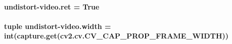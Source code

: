 \hypertarget{namespaceundistort-video_a5cf3044f0af40203e21a7231c2de5548}{
\paragraph[{ret}]{\setlength{\rightskip}{0pt plus 5cm}undistort-\/video.\-ret = True}}\label{namespaceundistort-video_a5cf3044f0af40203e21a7231c2de5548}
\hypertarget{namespaceundistort-video_adb4ad8deb16a759496b005486002c537}{
\paragraph[{width}]{\setlength{\rightskip}{0pt plus 5cm}tuple undistort-\/video.\-width = int(capture.\-get(cv2.\-cv.\-C\-V\-\_\-\-C\-A\-P\-\_\-\-P\-R\-O\-P\-\_\-\-F\-R\-A\-M\-E\-\_\-\-W\-I\-D\-T\-H))}}\label{namespaceundistort-video_adb4ad8deb16a759496b005486002c537}
